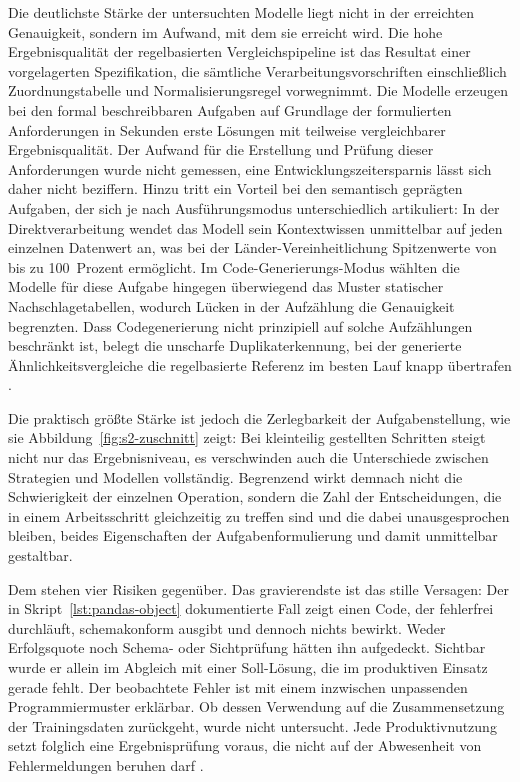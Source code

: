 Die deutlichste Stärke der untersuchten Modelle liegt nicht in der erreichten Genauigkeit, sondern im Aufwand, mit dem sie erreicht wird. Die hohe Ergebnisqualität der regelbasierten Vergleichspipeline ist das Resultat einer vorgelagerten Spezifikation, die sämtliche Verarbeitungsvorschriften einschließlich Zuordnungstabelle und Normalisierungsregel vorwegnimmt. Die Modelle erzeugen bei den formal beschreibbaren Aufgaben auf Grundlage der formulierten Anforderungen in Sekunden erste Lösungen mit teilweise vergleichbarer Ergebnisqualität. Der Aufwand für die Erstellung und Prüfung dieser Anforderungen wurde nicht gemessen, eine Entwicklungszeitersparnis lässt sich daher nicht beziffern. Hinzu tritt ein Vorteil bei den semantisch geprägten Aufgaben, der sich je nach Ausführungsmodus unterschiedlich artikuliert: In der Direktverarbeitung wendet das Modell sein Kontextwissen unmittelbar auf jeden einzelnen Datenwert an, was bei der Länder-Vereinheitlichung Spitzenwerte von bis zu 100~Prozent ermöglicht. Im Code-Generierungs-Modus wählten die Modelle für diese Aufgabe hingegen überwiegend das Muster statischer Nachschlagetabellen, wodurch Lücken in der Aufzählung die Genauigkeit begrenzten. Dass Codegenerierung nicht prinzipiell auf solche Aufzählungen beschränkt ist, belegt die unscharfe Duplikaterkennung, bei der generierte Ähnlichkeitsvergleiche die regelbasierte Referenz im besten Lauf knapp übertrafen \autocite{mumuniAutomatedDataProcessing2025,hassaniRoleChatGPTData2023}.

Die praktisch größte Stärke ist jedoch die Zerlegbarkeit der Aufgabenstellung, wie sie Abbildung~\ref{fig:s2-zuschnitt} zeigt: Bei kleinteilig gestellten Schritten steigt nicht nur das Ergebnisniveau, es verschwinden auch die Unterschiede zwischen Strategien und Modellen vollständig. Begrenzend wirkt demnach nicht die Schwierigkeit der einzelnen Operation, sondern die Zahl der Entscheidungen, die in einem Arbeitsschritt gleichzeitig zu treffen sind und die dabei unausgesprochen bleiben, beides Eigenschaften der Aufgabenformulierung und damit unmittelbar gestaltbar.

Dem stehen vier Risiken gegenüber. Das gravierendste ist das stille Versagen: Der in Skript~\ref{lst:pandas-object} dokumentierte Fall zeigt einen Code, der fehlerfrei durchläuft, schemakonform ausgibt und dennoch nichts bewirkt. Weder Erfolgsquote noch Schema- oder Sichtprüfung hätten ihn aufgedeckt. Sichtbar wurde er allein im Abgleich mit einer Soll-Lösung, die im produktiven Einsatz gerade fehlt. Der beobachtete Fehler ist mit einem inzwischen unpassenden Programmiermuster erklärbar. Ob dessen Verwendung auf die Zusammensetzung der Trainingsdaten zurückgeht, wurde nicht untersucht. Jede Produktivnutzung setzt folglich eine Ergebnisprüfung voraus, die nicht auf der Abwesenheit von Fehlermeldungen beruhen darf \autocite{hassaniRoleChatGPTData2023,mumuniAutomatedDataProcessing2025}.

